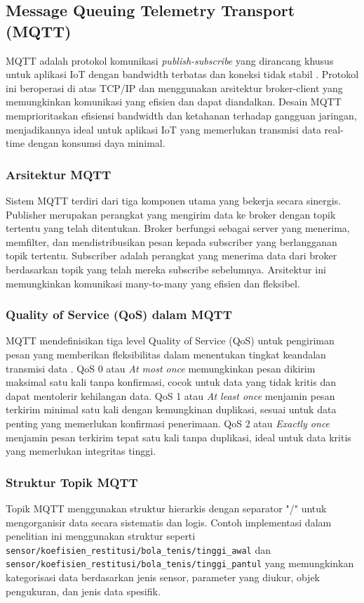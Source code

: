 \subsection{Message Queuing Telemetry Transport (MQTT)}
MQTT adalah protokol komunikasi \textit{publish-subscribe} yang dirancang khusus untuk aplikasi IoT dengan bandwidth terbatas dan koneksi tidak stabil \citep{zhang2021iot}. Protokol ini beroperasi di atas TCP/IP dan menggunakan arsitektur broker-client yang memungkinkan komunikasi yang efisien dan dapat diandalkan. Desain MQTT memprioritaskan efisiensi bandwidth dan ketahanan terhadap gangguan jaringan, menjadikannya ideal untuk aplikasi IoT yang memerlukan transmisi data real-time dengan konsumsi daya minimal.

\subsubsection{Arsitektur MQTT}
Sistem MQTT terdiri dari tiga komponen utama yang bekerja secara sinergis. Publisher merupakan perangkat yang mengirim data ke broker dengan topik tertentu yang telah ditentukan. Broker berfungsi sebagai server yang menerima, memfilter, dan mendistribusikan pesan kepada subscriber yang berlangganan topik tertentu. Subscriber adalah perangkat yang menerima data dari broker berdasarkan topik yang telah mereka subscribe sebelumnya. Arsitektur ini memungkinkan komunikasi many-to-many yang efisien dan fleksibel.

\subsubsection{Quality of Service (QoS) dalam MQTT}
MQTT mendefinisikan tiga level Quality of Service (QoS) untuk pengiriman pesan yang memberikan fleksibilitas dalam menentukan tingkat keandalan transmisi data \citep{anderson2019digital}. QoS 0 atau \textit{At most once} memungkinkan pesan dikirim maksimal satu kali tanpa konfirmasi, cocok untuk data yang tidak kritis dan dapat mentolerir kehilangan data. QoS 1 atau \textit{At least once} menjamin pesan terkirim minimal satu kali dengan kemungkinan duplikasi, sesuai untuk data penting yang memerlukan konfirmasi penerimaan. QoS 2 atau \textit{Exactly once} menjamin pesan terkirim tepat satu kali tanpa duplikasi, ideal untuk data kritis yang memerlukan integritas tinggi.

\subsubsection{Struktur Topik MQTT}
Topik MQTT menggunakan struktur hierarkis dengan separator "/" untuk mengorganisir data secara sistematis dan logis. Contoh implementasi dalam penelitian ini menggunakan struktur seperti \lstinline|sensor/koefisien_restitusi/bola_tenis/tinggi_awal| dan \lstinline|sensor/koefisien_restitusi/bola_tenis/tinggi_pantul| yang memungkinkan kategorisasi data berdasarkan jenis sensor, parameter yang diukur, objek pengukuran, dan jenis data spesifik.

